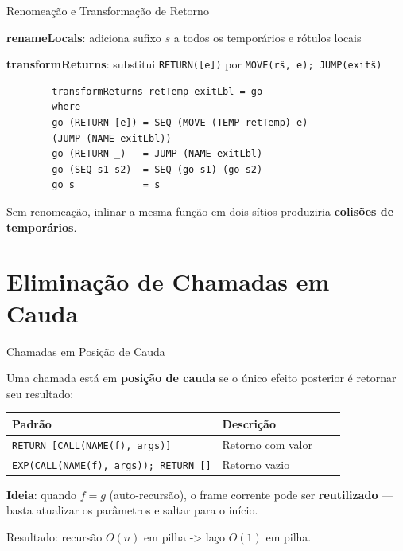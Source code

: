 \begin{frame}[fragile]{Renomeação e Transformação de Retorno}

    \textbf{renameLocals}: adiciona sufixo \(s\) a todos os temporários e
    rótulos locais

    \textbf{transformReturns}: substitui
    \texttt{RETURN([e])} por
    \texttt{MOVE(r\^s, e); JUMP(exit\^s)}

    \begin{lstlisting}
        transformReturns retTemp exitLbl = go
        where
        go (RETURN [e]) = SEQ (MOVE (TEMP retTemp) e)
        (JUMP (NAME exitLbl))
        go (RETURN _)   = JUMP (NAME exitLbl)
        go (SEQ s1 s2)  = SEQ (go s1) (go s2)
        go s            = s
    \end{lstlisting}

    Sem renomeação, inlinar a mesma função em dois sítios produziria
    \textbf{colisões de temporários}.
\end{frame}


\section{Eliminação de Chamadas em
Cauda}\label{eliminauxe7uxe3o-de-chamadas-em-cauda}

\begin{frame}[fragile]{Chamadas em Posição de Cauda}

    Uma chamada está em \textbf{posição de cauda} se o único efeito
    posterior é retornar seu resultado:

    \begin{table}
        \begin{tabular}{l l l l}
            \hline
            Padrão & Descrição \\
            \hline
            \texttt{RETURN [CALL(NAME(f), args)]} & Retorno com
            valor \\
            \texttt{EXP(CALL(NAME(f), args)); RETURN []} & Retorno
            vazio \\
            \hline
        \end{tabular}
    \end{table}

    \textbf{Ideia}: quando \(f = g\) (auto-recursão), o frame corrente pode
    ser \textbf{reutilizado} --- basta atualizar os parâmetros e saltar para
    o início.

    Resultado: recursão \(O(n)\) em pilha -> laço \(O(1)\) em pilha.
\end{frame}

